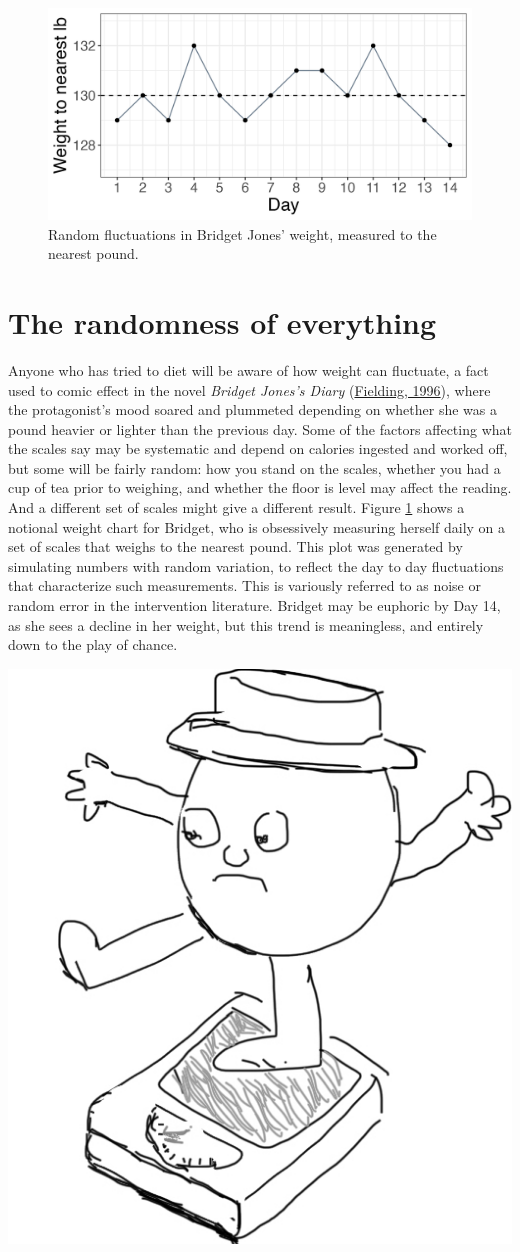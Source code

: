 \documentclass{krantz}
\begin{document}
\begin{figure}
\includegraphics[width=0.75\linewidth]{images_bw/weightplot} \caption{Random fluctuations in Bridget Jones' weight, measured to the nearest pound.}\label{fig:weightplot}
\end{figure}

\hypertarget{the-randomness-of-everything}{%
\section{The randomness of everything}\label{the-randomness-of-everything}}

Anyone who has tried to diet will be aware of how weight can fluctuate, a fact used to comic effect in the novel \textit{Bridget Jones's Diary} (\protect\hyperlink{ref-fielding1996}{Fielding, 1996}), where the protagonist's mood soared and plummeted depending on whether she was a pound heavier or lighter than the previous day. Some of the factors affecting what the scales say may be systematic and depend on calories ingested and worked off, but some will be fairly random: how you stand on the scales, whether you had a cup of tea prior to weighing, and whether the floor is level may affect the reading. And a different set of scales might give a different result. Figure \ref{fig:weightplot} shows a notional weight chart for Bridget, who is obsessively measuring herself daily on a set of scales that weighs to the nearest pound. This plot was generated by simulating numbers with random variation, to reflect the day to day fluctuations that characterize such measurements. This is variously referred to as noise or random error in the intervention literature. Bridget may be euphoric by Day 14, as she sees a decline in her weight, but this trend is meaningless, and entirely down to the play of chance.

\begin{center}

\includegraphics[width=0.25\linewidth]{images_bw/scales_man} 
\end{center}
\end{document}
